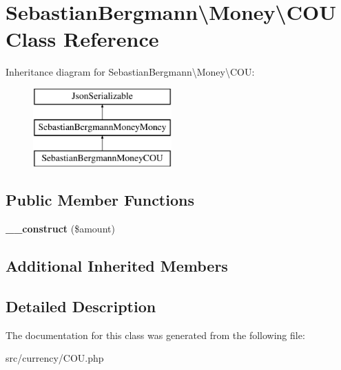 \hypertarget{classSebastianBergmann_1_1Money_1_1COU}{}\section{Sebastian\+Bergmann\textbackslash{}Money\textbackslash{}C\+O\+U Class Reference}
\label{classSebastianBergmann_1_1Money_1_1COU}
Inheritance diagram for Sebastian\+Bergmann\textbackslash{}Money\textbackslash{}C\+O\+U\+:\begin{figure}[H]
\begin{center}
\leavevmode
\includegraphics[height=3.000000cm]{classSebastianBergmann_1_1Money_1_1COU}
\end{center}
\end{figure}
\subsection*{Public Member Functions}
\begin{DoxyCompactItemize}
\item 
\hypertarget{classSebastianBergmann_1_1Money_1_1COU_a2cbb055fc82ea2a499a62bc885f7eb0a}{}{\bfseries \+\_\+\+\_\+construct} (\$amount)\label{classSebastianBergmann_1_1Money_1_1COU_a2cbb055fc82ea2a499a62bc885f7eb0a}

\end{DoxyCompactItemize}
\subsection*{Additional Inherited Members}


\subsection{Detailed Description}


The documentation for this class was generated from the following file\+:\begin{DoxyCompactItemize}
\item 
src/currency/C\+O\+U.\+php\end{DoxyCompactItemize}
